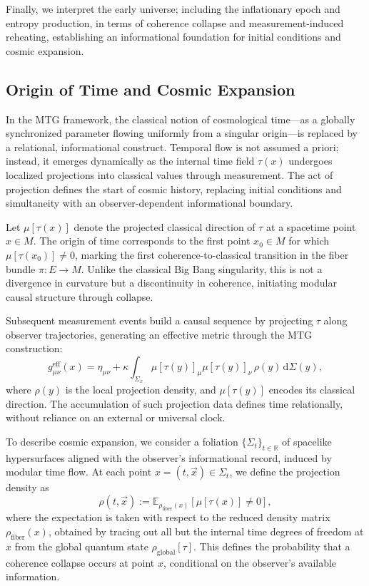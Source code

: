 \documentclass[11pt]{article}
\begin{document}
Finally, we interpret the early universe; including the inflationary epoch and entropy production, in terms of coherence collapse and measurement-induced reheating, establishing an informational foundation for initial conditions and cosmic expansion.


\subsection{Origin of Time and Cosmic Expansion}

In the MTG framework, the classical notion of cosmological time—as a globally synchronized parameter flowing uniformly from a singular origin—is replaced by a relational, informational construct. Temporal flow is not assumed a priori; instead, it emerges dynamically as the internal time field \( \tau(x) \) undergoes localized projections into classical values through measurement. The act of projection defines the start of cosmic history, replacing initial conditions and simultaneity with an observer-dependent informational boundary.

Let \( \mu[\tau(x)] \) denote the projected classical direction of \( \tau \) at a spacetime point \( x \in M \). The origin of time corresponds to the first point \( x_0 \in M \) for which \( \mu[\tau(x_0)] \neq 0 \), marking the first coherence-to-classical transition in the fiber bundle \( \pi: E \to M \). Unlike the classical Big Bang singularity, this is not a divergence in curvature but a discontinuity in coherence, initiating modular causal structure through collapse.

Subsequent measurement events build a causal sequence by projecting \( \tau \) along observer trajectories, generating an effective metric through the MTG construction:
\begin{equation}
g^{\mathrm{eff}}_{\mu\nu}(x) = \eta_{\mu\nu} + \kappa \int_{\Sigma_x} \mu[\tau(y)]_\mu \mu[\tau(y)]_\nu \, \rho(y) \, \mathrm{d}\Sigma(y),
\end{equation}
where \( \rho(y) \) is the local projection density, and \( \mu[\tau(y)] \) encodes its classical direction. The accumulation of such projection data defines time relationally, without reliance on an external or universal clock.

To describe cosmic expansion, we consider a foliation \( \{\Sigma_t\}_{t \in \mathbb{R}} \) of spacelike hypersurfaces aligned with the observer’s informational record, induced by modular time flow. At each point \( x = (t, \vec{x}) \in \Sigma_t \), we define the projection density as
\begin{equation}
\rho(t, \vec{x}) := \mathbb{E}_{\rho_{\mathrm{fiber}}(x)} \left[ \mu[\tau(x)] \neq 0 \right],
\end{equation}
where the expectation is taken with respect to the reduced density matrix \( \rho_{\mathrm{fiber}}(x) \), obtained by tracing out all but the internal time degrees of freedom at \( x \) from the global quantum state \( \rho_{\mathrm{global}}[\tau] \). This defines the probability that a coherence collapse occurs at point \( x \), conditional on the observer’s available information.
\end{document}
